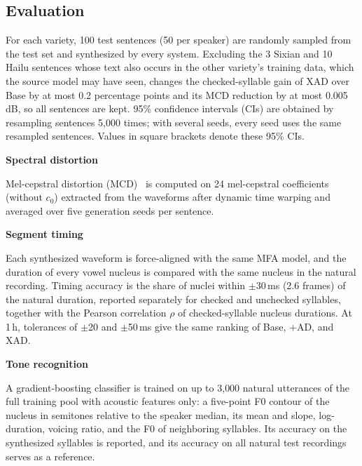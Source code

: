 \documentclass[conference,a4paper]{IEEEtran}
\newcommand{\parhead}[1]{\par\vspace{2pt}\noindent\textbf{#1}\par\nobreak}
\begin{document}
\subsection{Evaluation}
For each variety, 100 test sentences (50 per speaker) are randomly sampled from the test set and synthesized by every system. Excluding the 3 Sixian and 10 Hailu sentences whose text also occurs in the other variety's training data, which the source model may have seen, changes the checked-syllable gain of XAD over Base by at most 0.2 percentage points and its MCD reduction by at most 0.005\,dB, so all sentences are kept. 95\% confidence intervals (CIs) are obtained by resampling sentences 5{,}000 times; with several seeds, every seed uses the same resampled sentences. Values in square brackets denote these 95\% CIs.

\parhead{Spectral distortion}
Mel-cepstral distortion (MCD)~\cite{kubichek1993mcd} is computed on 24 mel-cepstral coefficients (without $c_0$) extracted from the waveforms after dynamic time warping and averaged over five generation seeds per sentence.

\parhead{Segment timing}
Each synthesized waveform is force-aligned with the same MFA model, and the duration of every vowel nucleus is compared with the same nucleus in the natural recording. Timing accuracy is the share of nuclei within $\pm$30\,ms (2.6 frames) of the natural duration, reported separately for checked and unchecked syllables, together with the Pearson correlation $\rho$ of checked-syllable nucleus durations. At 1\,h, tolerances of $\pm$20 and $\pm$50\,ms give the same ranking of Base, +AD, and XAD.

\parhead{Tone recognition}
A gradient-boosting classifier is trained on up to 3{,}000 natural utterances of the full training pool with acoustic features only: a five-point F0 contour of the nucleus in semitones relative to the speaker median, its mean and slope, log-duration, voicing ratio, and the F0 of neighboring syllables. Its accuracy on the synthesized syllables is reported, and its accuracy on all natural test recordings serves as a reference.
\end{document}
